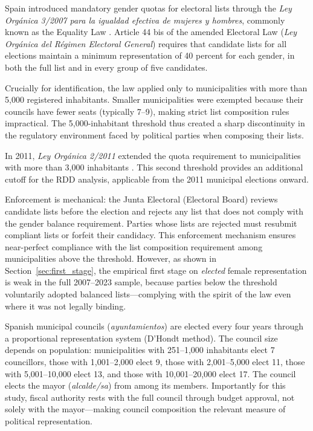 \documentclass[12pt]{article}
\begin{document}
Spain introduced mandatory gender quotas for electoral lists through the \emph{Ley Org\'{a}nica 3/2007 para la igualdad efectiva de mujeres y hombres}, commonly known as the Equality Law \citep{ley2007}. Article 44 bis of the amended Electoral Law (\emph{Ley Org\'{a}nica del R\'{e}gimen Electoral General}) requires that candidate lists for all elections maintain a minimum representation of 40 percent for each gender, in both the full list and in every group of five candidates.

Crucially for identification, the law applied only to municipalities with more than 5,000 registered inhabitants. Smaller municipalities were exempted because their councils have fewer seats (typically 7--9), making strict list composition rules impractical. The 5,000-inhabitant threshold thus created a sharp discontinuity in the regulatory environment faced by political parties when composing their lists.

In 2011, \emph{Ley Org\'{a}nica 2/2011} extended the quota requirement to municipalities with more than 3,000 inhabitants \citep{ley2011}. This second threshold provides an additional cutoff for the RDD analysis, applicable from the 2011 municipal elections onward.

Enforcement is mechanical: the Junta Electoral (Electoral Board) reviews candidate lists before the election and rejects any list that does not comply with the gender balance requirement. Parties whose lists are rejected must resubmit compliant lists or forfeit their candidacy. This enforcement mechanism ensures near-perfect compliance with the list composition requirement among municipalities above the threshold. However, as shown in Section~\ref{sec:first_stage}, the empirical first stage on \emph{elected} female representation is weak in the full 2007--2023 sample, because parties below the threshold voluntarily adopted balanced lists---complying with the spirit of the law even where it was not legally binding.

Spanish municipal councils (\emph{ayuntamientos}) are elected every four years through a proportional representation system (D'Hondt method). The council size depends on population: municipalities with 251--1,000 inhabitants elect 7 councillors, those with 1,001--2,000 elect 9, those with 2,001--5,000 elect 11, those with 5,001--10,000 elect 13, and those with 10,001--20,000 elect 17. The council elects the mayor (\emph{alcalde/sa}) from among its members. Importantly for this study, fiscal authority rests with the full council through budget approval, not solely with the mayor---making council composition the relevant measure of political representation.
\end{document}

